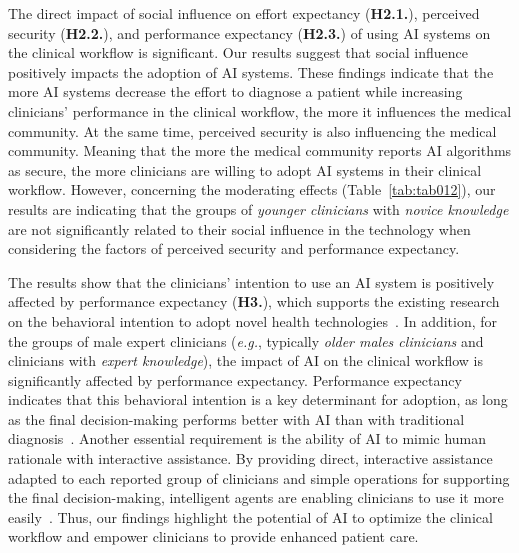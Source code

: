 The direct impact of social influence on effort expectancy ({\bf H2.1.}), perceived security ({\bf H2.2.}), and performance expectancy ({\bf H2.3.}) of using \ac{AI} systems on the clinical workflow is significant.
Our results suggest that social influence positively impacts the adoption of \ac{AI} systems.
These findings indicate that the more \ac{AI} systems decrease the effort to diagnose a patient while increasing clinicians' performance in the clinical workflow, the more it influences the medical community.
At the same time, perceived security is also influencing the medical community.
Meaning that the more the medical community reports \ac{AI} algorithms as secure, the more clinicians are willing to adopt \ac{AI} systems in their clinical workflow.
However, concerning the moderating effects (Table~\ref{tab:tab012}), our results are indicating that the groups of {\it younger clinicians} with {\it novice knowledge} are not significantly related to their social influence in the technology when considering the factors of perceived security and performance expectancy.

The results show that the clinicians' intention to use an \ac{AI} system is positively affected by performance expectancy ({\bf H3.}), which supports the existing research on the behavioral intention to adopt novel health technologies~\cite{WU2021106840}.
In addition, for the groups of male expert clinicians ({\it e.g.}, typically {\it older males clinicians} and clinicians with {\it expert knowledge}), the impact of \ac{AI} on the clinical workflow is significantly affected by performance expectancy.
Performance expectancy indicates that this behavioral intention is a key determinant for adoption, as long as the final decision-making performs better with \ac{AI} than with traditional diagnosis~\cite{LIN2021e486}.
Another essential requirement is the ability of \ac{AI} to mimic human rationale with interactive assistance.
By providing direct, interactive assistance adapted to each reported group of clinicians and simple operations for supporting the final decision-making, intelligent agents are enabling clinicians to use it more easily~\cite{CALISTO2021102607}.
Thus, our findings highlight the potential of \ac{AI} to optimize the clinical workflow and empower clinicians to provide enhanced patient care.

